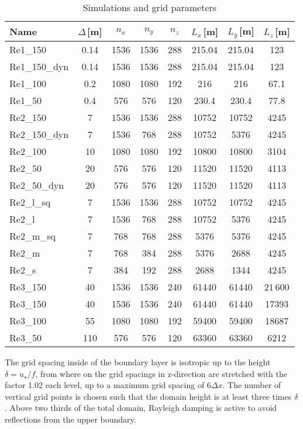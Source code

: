 \documentclass[a4paper,11pt]{article}
\begin{document}
\begin{table*}
	\centering
	\caption{Simulations and grid parameters}
	\begin{tabular}{lccccccc}
          \toprule 
	  Name & $\Delta$\,[m] & $n_x$ & $n_y$ & $n_z$ & $L_x$\,[m] & $L_y$\,[m] & $L_z$\,[m]  \\ 
          \midrule
          \midrule 
	  Re1\_150 & 0.14 & 1536 & 1536 & 288 & 215.04 & 215.04 & 123 \\
		  Re1\_150\_dyn & 0.14 & 1536 & 1536 & 288 & 215.04 & 215.04 & 123 \\
		  Re1\_100 & 0.2 & 1080 & 1080 & 192 & 216 & 216 & 67.1 \\
		  Re1\_50 & 0.4 & 576 & 576 & 120 & 230.4 & 230.4 & 77.8 \\
                  \midrule 
		  Re2\_150 & 7 & 1536 & 1536 & 288 & 10752 & 10752 & 4245 \\
		  Re2\_150\_dyn & 7 & 1536 & 768 & 288 & 10752 & 5376 & 4245 \\
		  Re2\_100 & 10 & 1080 & 1080 & 192 & 10800 & 10800 & 3104 \\
		  Re2\_50 & 20 & 576 & 576 & 120 & 11520 & 11520 & 4113 \\
		  Re2\_50\_dyn & 20 & 576 & 576 & 120 & 11520 & 11520 & 4113 \\
                  \midrule 
		  Re2\_l\_sq & 7 & 1536 & 1536 & 288 & 10752 & 10752 & 4245 \\
		  Re2\_l & 7 & 1536 & 768 & 288 & 10752 & 5376 & 4245 \\
		  Re2\_m\_sq & 7 & 768 & 768 & 288 & 5376 & 5376 & 4245 \\
		  Re2\_m & 7 & 768 & 384 & 288 & 5376 & 2688 & 4245 \\
		  Re2\_s & 7 & 384 & 192 & 288 & 2688 & 1344 & 4245 \\
                  \midrule 
		  Re3\_150 & 40 & 1536 & 1536 & 240 & 61440 & 61440 & 2$1\,600$ \\
		  Re3\_150 & 40 & 1536 & 1536 & 240 & 61440 & 61440 & 17393 \\
		  Re3\_100 & 55 & 1080 & 1080 & 192 & 59400 & 59400 & 18687 \\
		  Re3\_50 & 110 & 576 & 576 & 120 & 63360 & 63360 & 6212 \\
		\end{tabular}
	\label{simulation_parameters2}
\end{table*}

The grid spacing inside of the boundary layer is isotropic up to the height $\delta = u_\star/f$, from where on the grid spacings in z-direction are stretched with the factor 1.02 each level, up to a maximum grid spacing of $6\Delta x$. The number of vertical grid points is chosen such that the domain height is at least three times $\delta$. Above two thirds of the total domain, Rayleigh damping is active to avoid reflections from the upper boundary. 
\end{document}
